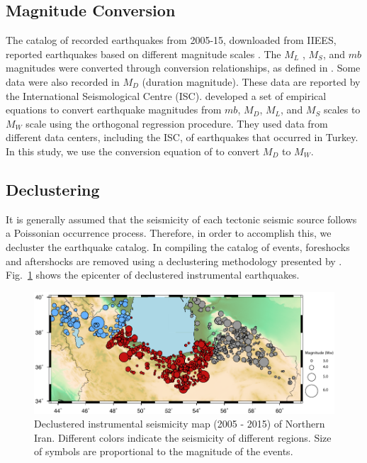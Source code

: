 \subsection{Magnitude Conversion}
\noindent
The catalog of recorded earthquakes from 2005-15, downloaded from IIEES, reported earthquakes based on different magnitude scales \citep{IIEES}. The  $M_L$ ,  $M_S$, and  $mb$  magnitudes were converted through conversion relationships, as defined in  \citet{Zare2014}. Some data were also recorded in  $M_D$  (duration magnitude). These data are reported by the International Seismological Centre (ISC).   \citet{Deniz2010}  developed a set of empirical equations to convert earthquake magnitudes from  $mb$,  $M_D$,  $M_L$, and  $M_S$  scales to  $M_W$  scale using the orthogonal regression procedure. They used data from different data centers, including the ISC, of earthquakes that occurred in Turkey. In this study, we use the conversion equation of  \citet{Deniz2010}  to convert  $M_D$  to  $M_W$. 

\subsection{Declustering} 
\noindent
It is generally assumed that the seismicity of each tectonic seismic source follows a Poissonian occurrence process. Therefore, in order to accomplish this, we decluster the earthquake catalog. In compiling the catalog of events, foreshocks and aftershocks are removed using a declustering methodology  presented by \citet{Gardner1974}. Fig.~\ref{fig:seismicity}  shows the epicenter of declustered instrumental  earthquakes.

\begin{figure} [ht]
\centering
\includegraphics[scale=1]{figures/pdf/Figure03.pdf} 
\caption{Declustered instrumental seismicity map (2005 - 2015) of Northern Iran. Different colors indicate the seismicity of different regions. Size of symbols are proportional to the magnitude of the events.}
\label{fig:seismicity}
\end{figure}


